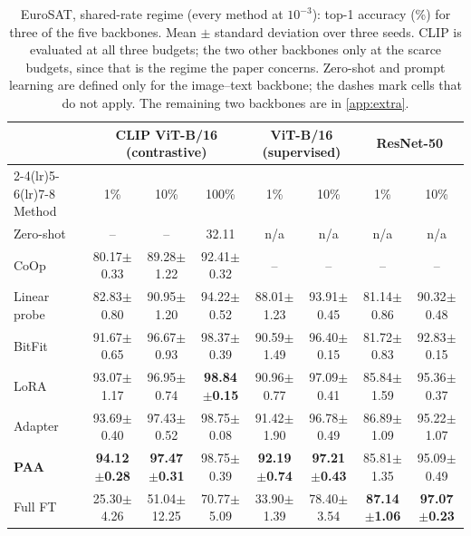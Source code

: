 \documentclass[preprint,12pt]{elsarticle}
\newcommand{\ours}{\textsc{PAA}}
\begin{document}
\begin{table}[t]
\centering
\caption{EuroSAT, shared-rate regime (every method at $10^{-3}$): top-1 accuracy
(\%) for three of the five backbones. Mean $\pm$ standard deviation over three
seeds. CLIP is evaluated at all three budgets; the two other backbones only at the
scarce budgets, since that is the regime the paper concerns. Zero-shot and prompt
learning are defined only for the image--text backbone; the dashes mark cells that
do not apply. The remaining two backbones are in \ref{app:extra}.}
\label{tab:eurosat}
\scriptsize
\setlength{\tabcolsep}{3.5pt}
\begin{tabular}{lccccccc}
\toprule
 & \multicolumn{3}{c}{CLIP ViT-B/16 (contrastive)} & \multicolumn{2}{c}{ViT-B/16 (supervised)} & \multicolumn{2}{c}{ResNet-50} \\
\cmidrule(lr){2-4}\cmidrule(lr){5-6}\cmidrule(lr){7-8}
Method & 1\% & 10\% & 100\% & 1\% & 10\% & 1\% & 10\% \\
\midrule
Zero-shot & -- & -- & 32.11 & n/a & n/a & n/a & n/a \\
CoOp & 80.17$\pm$0.33 & 89.28$\pm$1.22 & 92.41$\pm$0.32 & -- & -- & -- & -- \\
Linear probe & 82.83$\pm$0.80 & 90.95$\pm$1.20 & 94.22$\pm$0.52 & 88.01$\pm$1.23 & 93.91$\pm$0.45 & 81.14$\pm$0.86 & 90.32$\pm$0.48 \\
BitFit & 91.67$\pm$0.65 & 96.67$\pm$0.93 & 98.37$\pm$0.39 & 90.59$\pm$1.49 & 96.40$\pm$0.15 & 81.72$\pm$0.83 & 92.83$\pm$0.15 \\
LoRA & 93.07$\pm$1.17 & 96.95$\pm$0.74 & \textbf{98.84}$\pm$\textbf{0.15} & 90.96$\pm$0.77 & 97.09$\pm$0.41 & 85.84$\pm$1.59 & 95.36$\pm$0.37 \\
Adapter & 93.69$\pm$0.40 & 97.43$\pm$0.52 & 98.75$\pm$0.08 & 91.42$\pm$1.90 & 96.78$\pm$0.49 & 86.89$\pm$1.09 & 95.22$\pm$1.07 \\
\textbf{\ours} & \textbf{94.12}$\pm$\textbf{0.28} & \textbf{97.47}$\pm$\textbf{0.31} & 98.75$\pm$0.39 & \textbf{92.19}$\pm$\textbf{0.74} & \textbf{97.21}$\pm$\textbf{0.43} & 85.81$\pm$1.35 & 95.09$\pm$0.49 \\
Full FT & 25.30$\pm$4.26 & 51.04$\pm$12.25 & 70.77$\pm$5.09 & 33.90$\pm$1.39 & 78.40$\pm$3.54 & \textbf{87.14}$\pm$\textbf{1.06} & \textbf{97.07}$\pm$\textbf{0.23} \\
\bottomrule
\end{tabular}
\end{table}
\end{document}
